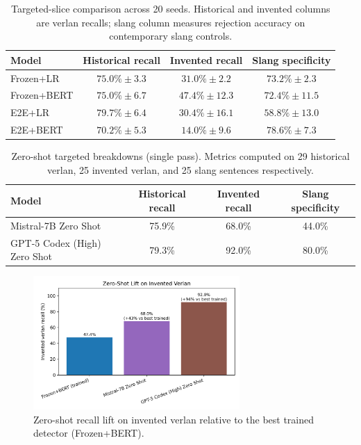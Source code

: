 \documentclass[12pt]{article}
\begin{document}
\begin{table}[H]
    \centering
    \footnotesize
    \begin{tabular}{lccc}
        \hline
        Model & Historical recall & Invented recall & Slang specificity \\
        \hline
        Frozen+LR & $75.0\%\pm3.3$ & $31.0\%\pm2.2$ & $73.2\%\pm2.3$ \\
        Frozen+BERT & $75.0\%\pm6.7$ & $47.4\%\pm12.3$ & $72.4\%\pm11.5$ \\
        E2E+LR & $79.7\%\pm6.4$ & $30.4\%\pm16.1$ & $58.8\%\pm13.0$ \\
        E2E+BERT & $70.2\%\pm5.3$ & $14.0\%\pm9.6$ & $78.6\%\pm7.3$ \\
        \hline
    \end{tabular}
    \caption{Targeted-slice comparison across 20 seeds. Historical and invented columns are verlan recalls; slang column measures rejection accuracy on contemporary slang controls.}
    \label{tab:appendix-targeted-metrics}
\end{table}

\begin{table}[H]
    \centering
    \footnotesize
    \begin{tabular}{lccc}
        \hline
        Model & Historical recall & Invented recall & Slang specificity \\
        \hline
        Mistral-7B Zero Shot & 75.9\% & 68.0\% & 44.0\% \\
        GPT-5 Codex (High) Zero Shot & 79.3\% & 92.0\% & 80.0\% \\
        \hline
    \end{tabular}
    \caption{Zero-shot targeted breakdowns (single pass). Metrics computed on 29 historical verlan, 25 invented verlan, and 25 slang sentences respectively.}
    \label{tab:appendix-zeroshot-targeted}
\end{table}

\begin{figure}[H]
    \centering
    \includegraphics[width=0.7\textwidth]{figures/invented_relative_improvement.png}
    \caption{Zero-shot recall lift on invented verlan relative to the best trained detector (Frozen+BERT).}
    \label{fig:invented-lift}
\end{figure}
\end{document}
